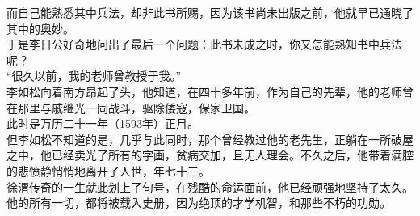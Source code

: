 \begin{multicols}{\theparacolNo}
而自己能熟悉其中兵法，却非此书所赐，因为该书尚未出版之前，他就早已通晓了其中的奥妙。\\

于是李日公好奇地问出了最后一个问题：此书未成之时，你又怎能熟知书中兵法呢？\\

“很久以前，我的老师曾教授于我。”\\

李如松向着南方昂起了头，他知道，在四十多年前，作为自己的先辈，他的老师曾在那里与戚继光一同战斗，驱除倭寇，保家卫国。\\

此时是万历二十一年（1593年）正月。\\

但李如松不知道的是，几乎与此同时，那个曾经教过他的老先生，正躺在一所破屋之中，他已经卖光了所有的字画，贫病交加，且无人理会。不久之后，他带着满腔的悲愤静悄悄地离开了人世，年七十三。\\

徐渭传奇的一生就此划上了句号，在残酷的命运面前，他已经顽强地坚持了太久。他的所有一切，都将被载入史册，因为绝顶的才学机智，和那些不朽的功勋。\\
\ifnum{}
	\end{multicols}
\fi
\newpage
